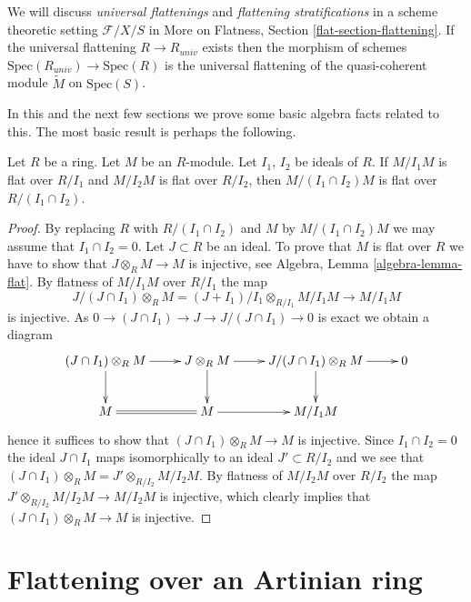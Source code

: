 \medskip\noindent
We will discuss {\it universal flattenings} and
{\it flattening stratifications} in a scheme theoretic
setting $\mathcal{F}/X/S$ in
More on Flatness, Section \ref{flat-section-flattening}.
If the universal flattening $R \to R_{univ}$ exists then the
morphism of schemes $\text{Spec}(R_{univ}) \to \text{Spec}(R)$ is the
universal flattening of the quasi-coherent module
$\widetilde{M}$ on $\text{Spec}(S)$.

\medskip\noindent
In this and the next few sections we prove some basic algebra facts
related to this. The most basic result is perhaps the following.

\begin{lemma}
\label{lemma-intersection-flat}
Let $R$ be a ring. Let $M$ be an $R$-module. Let $I_1$, $I_2$ be ideals of $R$.
If $M/I_1M$ is flat over $R/I_1$ and $M/I_2M$ is flat over $R/I_2$,
then $M/(I_1 \cap I_2)M$ is flat over $R/(I_1 \cap I_2)$.
\end{lemma}

\begin{proof}
By replacing $R$ with $R/(I_1 \cap I_2)$ and $M$ by $M/(I_1 \cap I_2)M$
we may assume that $I_1 \cap I_2 = 0$. Let $J \subset R$ be an ideal.
To prove that $M$ is flat over $R$ we have to show that
$J \otimes_R M \to M$ is injective, see
Algebra, Lemma \ref{algebra-lemma-flat}.
By flatness of $M/I_1M$ over $R/I_1$ the map
$$
J/(J \cap I_1) \otimes_R M =
(J + I_1)/I_1 \otimes_{R/I_1} M/I_1M
\longrightarrow M/I_1M
$$
is injective. As $0 \to (J \cap I_1) \to J \to J/(J \cap I_1) \to 0$
is exact we obtain a diagram
$$
\xymatrix{
(J \cap I_1) \otimes_R M \ar[r] \ar[d] &
J \otimes_R M \ar[r] \ar[d] &
J/(J \cap I_1) \otimes_R M \ar[r] \ar[d] & 0 \\
M \ar@{=}[r] &
M \ar[r] &
M/I_1M
}
$$
hence it suffices to show that $(J \cap I_1) \otimes_R M \to M$ is
injective. Since $I_1 \cap I_2 = 0$ the ideal $J \cap I_1$
maps isomorphically to an ideal $J' \subset R/I_2$ and we see that
$(J \cap I_1) \otimes_R M = J' \otimes_{R/I_2} M/I_2M$. By flatness
of $M/I_2M$ over $R/I_2$ the map $J' \otimes_{R/I_2} M/I_2M \to M/I_2M$
is injective, which clearly implies that $(J \cap I_1) \otimes_R M \to M$ is
injective.
\end{proof}





\section{Flattening over an Artinian ring}
\label{section-flattening-artinian}

